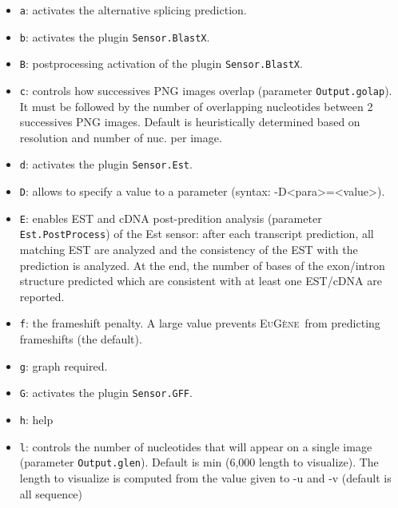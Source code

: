 \documentclass[a4paper,titlepage]{report}
\newcommand{\EuGene}{\textsc{EuG\`ene}}
\begin{document}
\begin{itemize}

\item \texttt{a}: activates the alternative splicing prediction.

\item \texttt{b}: activates the plugin \texttt{Sensor.BlastX}.

\item \texttt{B}: postprocessing activation of the plugin \texttt{Sensor.BlastX}.
  
\item \texttt{c}: controls how successives PNG images overlap (parameter
  \texttt{Output.golap}). It must be followed by the number of
  overlapping nucleotides between 2 successives PNG images. Default is
  heuristically determined based on resolution and number of nuc. per
  image.
 
\item \texttt{d}: activates the plugin \texttt{Sensor.Est}.

\item \texttt{D}: allows to specify a value to a parameter (syntax: -D<para>=<value>).
  
\item \texttt{E}: enables EST and cDNA post-predition analysis (parameter
  \texttt{Est.PostProcess}) of the Est sensor: after each transcript
  prediction, all matching EST are analyzed and the consistency of the
  EST with the prediction is analyzed. At the end, the number of bases
  of the exon/intron structure predicted which are consistent with at
  least one EST/cDNA are reported.

\item \texttt{f}: the frameshift penalty. A large value prevents
  \EuGene\ from predicting frameshifts (the default).

\item \texttt{g}: graph required.

\item \texttt{G}: activates the plugin \texttt{Sensor.GFF}.

\item \texttt{h}: help 
   
\item \texttt{l}: controls the number of nucleotides that will appear on a
  single image (parameter \texttt{Output.glen}). Default is min
  (6,000 length to visualize). The length to visualize is computed from
  the value given to -u and -v (default is all sequence)
 

\end{itemize}
\end{document}
